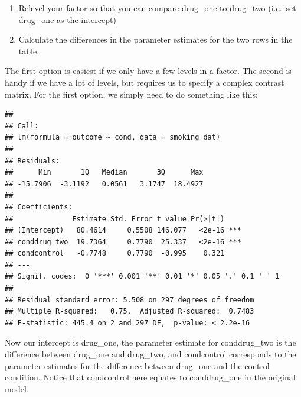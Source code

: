 \documentclass[
]{book}
\newenvironment{Shaded}{\begin{snugshade}}{\end{snugshade}}
\newcommand{\AttributeTok}[1]{\textcolor[rgb]{0.77,0.63,0.00}{#1}}
\newcommand{\FunctionTok}[1]{\textcolor[rgb]{0.00,0.00,0.00}{#1}}
\newcommand{\NormalTok}[1]{#1}
\newcommand{\OtherTok}[1]{\textcolor[rgb]{0.56,0.35,0.01}{#1}}
\newcommand{\SpecialCharTok}[1]{\textcolor[rgb]{0.00,0.00,0.00}{#1}}
\newcommand{\StringTok}[1]{\textcolor[rgb]{0.31,0.60,0.02}{#1}}
\providecommand{\tightlist}{%
  \setlength{\itemsep}{0pt}\setlength{\parskip}{0pt}}
\begin{document}
\begin{enumerate}
\def\labelenumi{\arabic{enumi}.}
\tightlist
\item
  Relevel your factor so that you can compare drug\_one to drug\_two (i.e.~set drug\_one as the intercept)
\item
  Calculate the differences in the parameter estimates for the two rows in the table.
\end{enumerate}

The first option is easiest if we only have a few levels in a factor. The second is handy if we have a lot of levels, but requires us to specify a complex contrast matrix. For the first option, we simply need to do something like this:

\begin{Shaded}
\end{Shaded}

\begin{verbatim}
## 
## Call:
## lm(formula = outcome ~ cond, data = smoking_dat)
## 
## Residuals:
##      Min       1Q   Median       3Q      Max 
## -15.7906  -3.1192   0.0561   3.1747  18.4927 
## 
## Coefficients:
##              Estimate Std. Error t value Pr(>|t|)    
## (Intercept)   80.4614     0.5508 146.077   <2e-16 ***
## conddrug_two  19.7364     0.7790  25.337   <2e-16 ***
## condcontrol   -0.7748     0.7790  -0.995    0.321    
## ---
## Signif. codes:  0 '***' 0.001 '**' 0.01 '*' 0.05 '.' 0.1 ' ' 1
## 
## Residual standard error: 5.508 on 297 degrees of freedom
## Multiple R-squared:   0.75,  Adjusted R-squared:  0.7483 
## F-statistic: 445.4 on 2 and 297 DF,  p-value: < 2.2e-16
\end{verbatim}

Now our intercept is drug\_one, the parameter estimate for conddrug\_two is the difference between drug\_one and drug\_two, and condcontrol corresponds to the parameter estimates for the difference between drug\_one and the control condition. Notice that condcontrol here equates to conddrug\_one in the original model.
\end{document}
